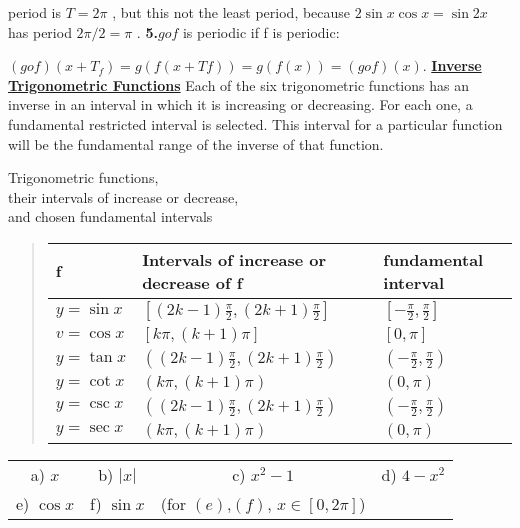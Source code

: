 \documentclass[11pt]{amsbook}
\begin{document}


period is $T= 2 \pi$ , but this not the least period, because $2\sin x\cos x = \sin 2x$ has period $2\pi /2=\pi$ .
\textbf{5.}$gof$ is periodic if f is periodic:
	
	$(gof)(x+ T_{f})=g(f(x+ T{f}))=g(f(x))=(gof)(x)$.
\textbf{\underline{Inverse Trigonometric Functions}}
Each of the six trigonometric functions has an inverse in an interval in which it is increasing or decreasing. For each one, a fundamental restricted interval is selected. This interval for a particular function will be the fundamental range of the inverse of that function.

\begin{center}
Trigonometric functions,\\
their intervals of increase or decrease,\\
and chosen fundamental intervals 
\end{center}

\begin{quote}
\begin{tabular}{l l l}
f&Intervals of increase or decrease of f & fundamental interval\\
\hline
$y= \sin x$&$[(2k-1)\frac{\pi}{2}, (2k+1)\frac{\pi}{2}]$ &$[-\frac{\pi}{2},\frac{\pi}{2}]$\\
$v= \cos x$&$[k\pi,(k+1)\pi]$&$[0,\pi]$ \\
$y=\tan x$&$((2k-1)\frac{\pi}{2}, (2k+1)\frac{\pi}{2})$&$(-\frac{\pi}{2},\frac{\pi}{2})$\\
$y=\cot x$&$(k\pi,(k+1)\pi)$&$(0,\pi)$ \\
$y=\csc x$&$((2k-1)\frac{\pi}{2}, (2k+1)\frac{\pi}{2})$&$(-\frac{\pi}{2},\frac{\pi}{2})$\\
$y=\sec x$&$(k\pi,(k+1)\pi)$&$(0,\pi)$ \\
\end{tabular}
\end{quote}
\begin{tabular}{c c c c}
a) $x$ & b) $|x|$ & c) $x^2 - 1$ & d) $4 - x^2$ \\
e) $\cos x$ & f) $\sin x$ &(for $(e)$,$(f)$, $x \in \left[ 0,2\pi \right]$)\\
\end{tabular}
\end{document}
